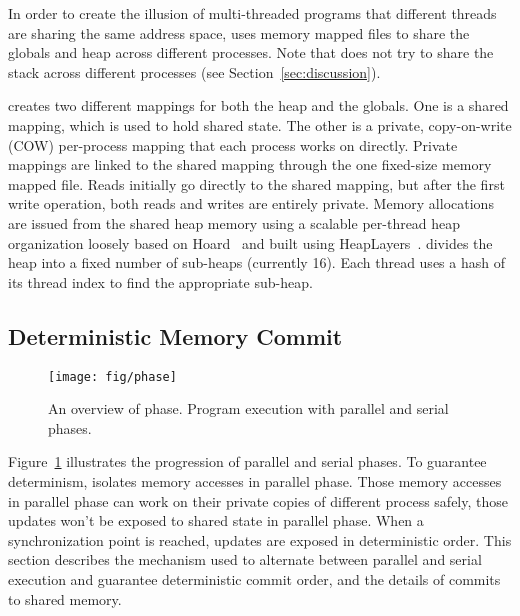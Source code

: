 In order to create the illusion of multi-threaded programs that
different threads are sharing the same address space, \dthreads{} uses
memory mapped files to share the globals and heap across different
processes. Note that \dthreads{} does not try to share the stack across
different processes (see Section~\ref{sec:discussion}).

\dthreads{} creates two different mappings for both the heap and the
globals.  One is a shared mapping, which is used to hold shared state.
The other is a private, copy-on-write (COW) per-process mapping that
each process works on directly.  Private mappings are linked to the
shared mapping through the one fixed-size memory mapped file.
Reads initially go directly to the shared mapping,
but after the first write operation,
both reads and writes are entirely private.
Memory allocations are issued from the shared heap memory using a scalable per-thread heap organization loosely based on Hoard~\cite{BergerMcKinleyBlumofeWilson:ASPLOS2000} and built using HeapLayers~\cite{BergerZornMcKinley:2001}.  \dthreads{} divides the heap into a fixed number of sub-heaps (currently 16).  Each thread uses a hash of its thread index to find the appropriate sub-heap.

\subsection{Deterministic Memory Commit}
\label{sec:sharedmem}

\begin{figure}
{\centering 
\texttt{[image: fig/phase]}
\caption{An overview of \dthreads{} phase. Program execution with \dthreads{} parallel and serial phases.\label{fig:phase}}
}
\end{figure}

Figure~\ref{fig:phase} illustrates the progression of parallel and serial phases. 
To guarantee determinism, \dthreads{} isolates memory accesses in parallel phase. Those memory accesses in
parallel phase can work on their private copies of different process safely, those updates won't be exposed to 
shared state in parallel phase.
When a synchronization point is reached, updates are exposed in deterministic order.  
This section describes the mechanism used to alternate between parallel and serial execution 
and guarantee deterministic commit order, and the details of commits to shared memory.


